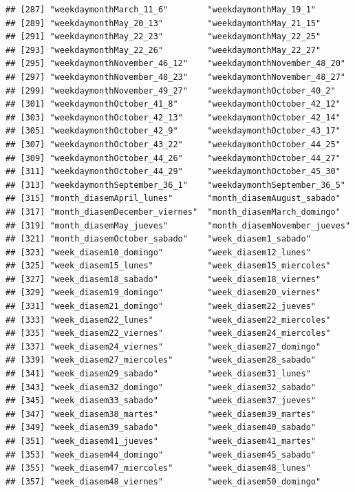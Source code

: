 \documentclass[
]{article}
\begin{document}
\begin{verbatim}
## [287] "weekdaymonthMarch_11_6"        "weekdaymonthMay_19_1"         
## [289] "weekdaymonthMay_20_13"         "weekdaymonthMay_21_15"        
## [291] "weekdaymonthMay_22_23"         "weekdaymonthMay_22_25"        
## [293] "weekdaymonthMay_22_26"         "weekdaymonthMay_22_27"        
## [295] "weekdaymonthNovember_46_12"    "weekdaymonthNovember_48_20"   
## [297] "weekdaymonthNovember_48_23"    "weekdaymonthNovember_48_27"   
## [299] "weekdaymonthNovember_49_27"    "weekdaymonthOctober_40_2"     
## [301] "weekdaymonthOctober_41_8"      "weekdaymonthOctober_42_12"    
## [303] "weekdaymonthOctober_42_13"     "weekdaymonthOctober_42_14"    
## [305] "weekdaymonthOctober_42_9"      "weekdaymonthOctober_43_17"    
## [307] "weekdaymonthOctober_43_22"     "weekdaymonthOctober_44_25"    
## [309] "weekdaymonthOctober_44_26"     "weekdaymonthOctober_44_27"    
## [311] "weekdaymonthOctober_44_29"     "weekdaymonthOctober_45_30"    
## [313] "weekdaymonthSeptember_36_1"    "weekdaymonthSeptember_36_5"   
## [315] "month_diasemApril_lunes"       "month_diasemAugust_sabado"    
## [317] "month_diasemDecember_viernes"  "month_diasemMarch_domingo"    
## [319] "month_diasemMay_jueves"        "month_diasemNovember_jueves"  
## [321] "month_diasemOctober_sabado"    "week_diasem1_sabado"          
## [323] "week_diasem10_domingo"         "week_diasem12_lunes"          
## [325] "week_diasem15_lunes"           "week_diasem15_miercoles"      
## [327] "week_diasem18_sabado"          "week_diasem18_viernes"        
## [329] "week_diasem19_domingo"         "week_diasem20_viernes"        
## [331] "week_diasem21_domingo"         "week_diasem22_jueves"         
## [333] "week_diasem22_lunes"           "week_diasem22_miercoles"      
## [335] "week_diasem22_viernes"         "week_diasem24_miercoles"      
## [337] "week_diasem24_viernes"         "week_diasem27_domingo"        
## [339] "week_diasem27_miercoles"       "week_diasem28_sabado"         
## [341] "week_diasem29_sabado"          "week_diasem31_lunes"          
## [343] "week_diasem32_domingo"         "week_diasem32_sabado"         
## [345] "week_diasem33_sabado"          "week_diasem37_jueves"         
## [347] "week_diasem38_martes"          "week_diasem39_martes"         
## [349] "week_diasem39_sabado"          "week_diasem40_sabado"         
## [351] "week_diasem41_jueves"          "week_diasem41_martes"         
## [353] "week_diasem44_domingo"         "week_diasem45_sabado"         
## [355] "week_diasem47_miercoles"       "week_diasem48_lunes"          
## [357] "week_diasem48_viernes"         "week_diasem50_domingo"        

\end{verbatim}
\end{document}

